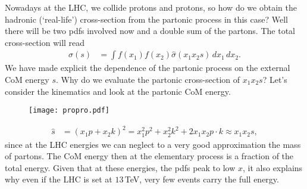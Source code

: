 \documentclass[a4paper, 11pt, normalem]{report}
\begin{document}
Nowadays at the LHC, we collide protons and protons, so how do we obtain the hadronic (`real-life') cross-section from the partonic process in this case?
Well there will be two pdfs involved now and a double sum of the partons.
The total cross-section will read
\begin{align}
    \sigma(s) &= \int f(x_1)f(x_2)\hat{\sigma}(x_1x_2s)\,dx_1\,dx_2.
\end{align}
We have made explicit the dependence of the partonic process on the external CoM energy $s$.
Why do we evaluate the partonic cross-section of $x_1x_2s$?
Let's consider the kinematics and look at the partonic CoM energy.
\begin{figure}[H]
    \centering
    \texttt{[image: propro.pdf]}
    \vspace{-30pt}
\end{figure}
\begin{align}
    \hat{s} &= (x_1p+x_2k)^2 = x_1^2p^2 + x_2^2k^2 + 2x_1x_2p\cdot k \approx x_1x_2s,
\end{align}
since at the LHC energies we can neglect to a very good approximation the mass of partons.
The CoM energy then at the elementary process is a fraction of the total energy.
Given that at these energies, the pdfs peak to low $x$, it also explains why even if the LHC is set at $13\,$TeV, very few events carry the full energy.
\end{document}
